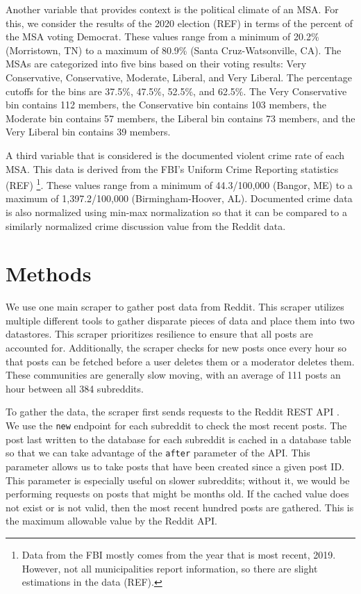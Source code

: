 \documentclass[12pt,oneside, letterpaper]{book}
\begin{document}
\par Another variable that provides context is the political climate of an MSA. For this, we consider the results of the 2020 election (REF) in terms of the percent of the MSA voting Democrat. These values range from a minimum of 20.2\% (Morristown, TN) to a maximum of 80.9\% (Santa Cruz-Watsonville, CA). The MSAs are categorized into five bins based on their voting results: Very Conservative, Conservative, Moderate, Liberal, and Very Liberal. The percentage cutoffs for the bins are 37.5\%, 47.5\%, 52.5\%, and 62.5\%. The Very Conservative bin contains 112 members, the Conservative bin contains 103 members, the Moderate bin contains 57 members, the Liberal bin contains 73 members, and the Very Liberal bin contains 39 members.

\par A third variable that is considered is the documented violent crime rate of each MSA. This data is derived from the FBI's Uniform Crime Reporting statistics (REF) \footnote{Data from the FBI mostly comes from the year that is most recent, 2019. However, not all municipalities report information, so there are slight estimations in the data (REF).}. These values range from a minimum of 44.3/100,000 (Bangor, ME) to a maximum of 1,397.2/100,000 (Birmingham-Hoover, AL). Documented crime data is also normalized using min-max normalization so that it can be compared to a similarly normalized crime discussion value from the Reddit data.

\section{Methods}
\par We use one main scraper to gather post data from Reddit. This scraper utilizes multiple different tools to gather disparate pieces of data and place them into two datastores. This scraper prioritizes resilience to ensure that all posts are accounted for. Additionally, the scraper checks for new posts once every hour so that posts can be fetched before a user deletes them or a moderator deletes them. These communities are generally slow moving, with an average of 111 posts an hour between all 384 subreddits.

\par To gather the data, the scraper first sends requests to the Reddit REST API \cite{reddit}. We use the \texttt{new} endpoint for each subreddit to check the most recent posts. The post last written to the database for each subreddit is cached in a database table so that we can take advantage of the \texttt{after} parameter of the API. This parameter allows us to take posts that have been created since a given post ID. This parameter is especially useful on slower subreddits; without it, we would be performing requests on posts that might be months old. If the cached value does not exist or is not valid, then the most recent hundred posts are gathered. This is the maximum allowable value by the Reddit API.
\end{document}
